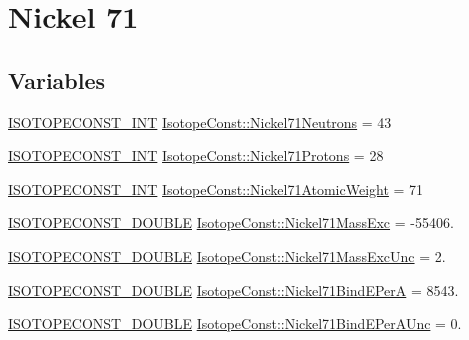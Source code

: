 \hypertarget{group___isotope_const-_nickel-_ni71}{}\section{Nickel 71}
\label{group___isotope_const-_nickel-_ni71}
\subsection*{Variables}
\begin{DoxyCompactItemize}
\item 
\mbox{\hyperlink{group___isotope_const-_macros_ga5f18360b3e99483a35c32d789e62621c}{I\+S\+O\+T\+O\+P\+E\+C\+O\+N\+S\+T\+\_\+\+I\+NT}} \mbox{\hyperlink{group___isotope_const-_nickel-_ni71_ga20408c7c2788a91c5554bd70ac92e8f0}{Isotope\+Const\+::\+Nickel71\+Neutrons}} = 43
\item 
\mbox{\hyperlink{group___isotope_const-_macros_ga5f18360b3e99483a35c32d789e62621c}{I\+S\+O\+T\+O\+P\+E\+C\+O\+N\+S\+T\+\_\+\+I\+NT}} \mbox{\hyperlink{group___isotope_const-_nickel-_ni71_ga6181664e458b7f025affe01405ff4ac9}{Isotope\+Const\+::\+Nickel71\+Protons}} = 28
\item 
\mbox{\hyperlink{group___isotope_const-_macros_ga5f18360b3e99483a35c32d789e62621c}{I\+S\+O\+T\+O\+P\+E\+C\+O\+N\+S\+T\+\_\+\+I\+NT}} \mbox{\hyperlink{group___isotope_const-_nickel-_ni71_gab0630db010eed2fcf461bdddf9d1ce4d}{Isotope\+Const\+::\+Nickel71\+Atomic\+Weight}} = 71
\item 
\mbox{\hyperlink{group___isotope_const-_macros_ga8f45a7272ce02c0b4c65c44636ed719a}{I\+S\+O\+T\+O\+P\+E\+C\+O\+N\+S\+T\+\_\+\+D\+O\+U\+B\+LE}} \mbox{\hyperlink{group___isotope_const-_nickel-_ni71_ga0636ecf77187c522bb29a0b1cf75bab0}{Isotope\+Const\+::\+Nickel71\+Mass\+Exc}} = -\/55406.
\item 
\mbox{\hyperlink{group___isotope_const-_macros_ga8f45a7272ce02c0b4c65c44636ed719a}{I\+S\+O\+T\+O\+P\+E\+C\+O\+N\+S\+T\+\_\+\+D\+O\+U\+B\+LE}} \mbox{\hyperlink{group___isotope_const-_nickel-_ni71_ga3decfefa79e81d8e188c839f24957175}{Isotope\+Const\+::\+Nickel71\+Mass\+Exc\+Unc}} = 2.
\item 
\mbox{\hyperlink{group___isotope_const-_macros_ga8f45a7272ce02c0b4c65c44636ed719a}{I\+S\+O\+T\+O\+P\+E\+C\+O\+N\+S\+T\+\_\+\+D\+O\+U\+B\+LE}} \mbox{\hyperlink{group___isotope_const-_nickel-_ni71_gaede2448febe4b27f3906bdc131d54b29}{Isotope\+Const\+::\+Nickel71\+Bind\+E\+PerA}} = 8543.
\item 
\mbox{\hyperlink{group___isotope_const-_macros_ga8f45a7272ce02c0b4c65c44636ed719a}{I\+S\+O\+T\+O\+P\+E\+C\+O\+N\+S\+T\+\_\+\+D\+O\+U\+B\+LE}} \mbox{\hyperlink{group___isotope_const-_nickel-_ni71_ga5dde427028dabfa108bf1e3170811999}{Isotope\+Const\+::\+Nickel71\+Bind\+E\+Per\+A\+Unc}} = 0.

\end{DoxyCompactItemize}

